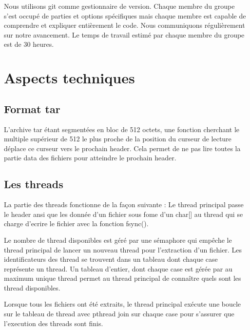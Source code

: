 \documentclass[a4paper,11pt, oneside]{book}
\begin{document}
	\par{Nous utilisons git comme gestionnaire de version. Chaque membre du groupe s'est occupé de parties et options spécifiques mais chaque membre est capable de comprendre et expliquer entièrement le code. Nous communiquons régulièrement sur notre avancement.\newline
Le temps de travail estimé par chaque membre du groupe est de 30 heures.}\newline
\newpage
{\let\clearpage\relax\chapter{Aspects techniques}}

{\let\clearpage\relax\section{ Format tar}}
\par{L'archive tar étant segmentées en bloc de 512 octets, une fonction cherchant le multiple supérieur de 512 le plus proche de la position du curseur de lecture déplace ce curseur vers le prochain header. Cela permet de ne pas lire toutes la partie data des fichiers pour atteindre le prochain header.}\newline


{\let\clearpage\relax\section{ Les threads}}
\par{La partie des threads fonctionne de la façon suivante : Le thread principal passe le header ansi que les donnée d'un fichier sous fome d'un char[] au thread qui se charge d'ecrire le fichier avec la fonction fsync().}

\par{Le nombre de thread disponibles est géré par une sémaphore qui empêche le thread principal de lancer un nouveau thread pour l'extraction d'un fichier. Les identificateurs des thread se trouvent dans un tableau dont chaque case représente un thread. Un tableau d'entier, dont chaque case est gérée par  au maximum unique thread permet au thread principal de connaître quels sont les thread disponibles.}

\par{Lorsque tous les fichiers ont été extraits, le thread principal exécute une boucle sur le tableau de thread  avec pthread join sur chaque case pour s'assurer que l'execution des  threads sont finis.}\newline
\end{document}
